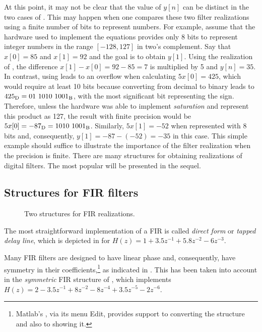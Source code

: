 At this point, it may not be clear that the value of $y[n]$ can be distinct in the two cases of . This may happen when one compares these two filter realizations using a finite number of bits to represent numbers. For example, assume that the hardware used to implement the equations provides only 8 bits to represent integer numbers in the range $[-128,127]$ in two's complement. Say that $x[0]=85$ and $x[1]=92$ and the goal is to obtain $y[1]$. Using the realization of , the difference $x[1] - x[0]=92-85=7$ is multiplied by 5 and $y[n]=35$. In contrast, using  leads to an overflow when calculating $5 x[0] = 425$, which would require at least 10 bits because converting from decimal to binary leads to $425_{\textrm D} = 01\textrm{~}1010\textrm{~}1001_{\textrm B}$, with the most significant bit representing the sign. Therefore, unless the hardware was able to implement \emph{saturation} and represent this product as 127, the result with finite precision would be $5 x[0]=-87_{\textrm D}=1010\textrm{~}1001_{\textrm B}$. Similarly, $5 x[1]=-52$ when represented with 8 bits and, consequently, $y[1]=-87 - (-52)=-35$ in this case. This simple example should suffice to illustrate the importance of the filter realization when the precision is finite. There are many structures for obtaining realizations of digital filters. The most popular will be presented in the sequel.

\subsection{Structures for FIR filters}

\begin{figure}
  \begin{center}
  \caption{Two structures for FIR realizations.\label{fig:fir_structures}}  
  \end{center}
\end{figure}


The most straightforward implementation of a FIR is called \emph{direct form} or \emph{tapped delay line}, which is depicted in  for $H(z)=1 + 3.5 z^{-1} + 5.8 z^{-2} - 6 z^{-3}$.

Many FIR filters are designed to have linear phase and, consequently, have symmetry in their coefficients,\footnote{Matlab's , via its menu Edit, provides support to converting the structure and also to showing it.} as indicated in . 
This has been taken into account in the \emph{symmetric} FIR structure of , which implements $H(z)=2 - 3.5 z^{-1} + 8 z^{-2} - 8 z^{-4} + 3.5 z^{-5} - 2 z^{-6}$.

